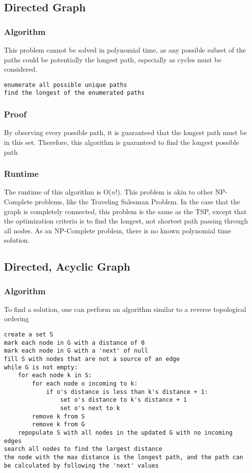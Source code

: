 \documentclass[titlepage]{article}
\numberwithin{equation}{subsection}
\begin{document}
\subsection{Directed Graph}
\subsubsection{Algorithm}
This problem cannot be solved in polynomial time,
as any possible subset of the paths could be potentially
the longest path, especially as cycles must be considered.
\begin{lstlisting}
enumerate all possible unique paths
find the longest of the enumerated paths
\end{lstlisting}
\subsubsection{Proof}
By observing every possible path, it is guaranteed that the
longest path must be in this set. Therefore, this algorithm is
guaranteed to find the longest possible path
\subsubsection{Runtime}
The runtime of this algorithm is O($n!$). This problem is akin to
other NP-Complete problems, like the Traveling Salesman Problem. In
the case that the graph is completely connected, this problem is the same
as the TSP, except that the optimization criteria is to find the longest,
not shortest path passing through all nodes. As an NP-Complete problem,
there is no known polynomial time solution.
\subsection{Directed, Acyclic Graph}
\subsubsection{Algorithm}
To find a solution, one can perform an algorithm similar to a reverse topological ordering\\
\begin{minipage}{\linewidth}
\begin{lstlisting}
create a set S
mark each node in G with a distance of 0
mark each node in G with a 'next' of null
fill S with nodes that are not a source of an edge
while G is not empty:
    for each node k in S:
        for each node o incoming to k:
            if o's distance is less than k's distance + 1:
                set o's distance to k's distance + 1
                set o's next to k
        remove k from S
        remove k from G
    repopulate S with all nodes in the updated G with no incoming edges
search all nodes to find the largest distance
the node with the max distance is the longest path, and the path can be calculated by following the 'next' values
\end{lstlisting}
\end{minipage}
\end{document}
